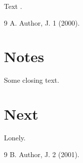 \documentclass{article}
\begin{document}
Text \cite{a,b}.
\begin{thebibliography}{9}
 A. Author, J. 1 (2000).
\section*{Notes}
Some closing text.
\end{thebibliography}
\section{Next}
 Lonely.
\begin{thebibliography}{9}
 B. Author, J. 2 (2001).
\end{thebibliography}
\end{document}
